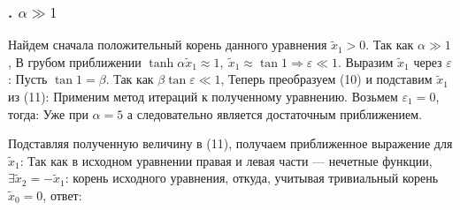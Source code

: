 \documentclass[a4paper, 12pt]{article}
\begin{document}
\subsubsection*{. $\alpha \gg 1$}
Найдем сначала положительный корень данного уравнения $\tilde{x}_1 > 0$. Так как $\alpha \gg 1$,
В грубом приближении $\tanh{\alpha\tilde{x}_1} \approx 1, \ \tilde{x}_1 \approx \tan{1} \Rightarrow \varepsilon \ll 1$.
Выразим $\tilde{x}_1$ через $\varepsilon$:
Пусть $\tan{1} = \beta$. Так как $\beta\tan{\varepsilon} \ll 1$,
Теперь преобразуем (10) и подставим $\tilde{x}_1$ из (11):
Применим метод итераций к полученному уравнению. Возьмем $\varepsilon_1 = 0$, тогда:
Уже при $\alpha = 5$
а следовательно
является достаточным приближением.

Подставляя полученную величину в (11), получаем приближенное выражение для $\tilde{x}_1$:
Так как в исходном уравнении правая и левая части --- нечетные функции, $\exists \tilde{x}_2 = -\tilde{x}_1$:
корень исходного уравнения, откуда, учитывая тривиальный корень $\tilde{x}_0 = 0$, ответ:
\end{document}
